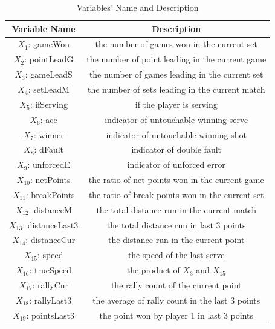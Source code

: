 \documentclass[12pt]{article}
\begin{document}
\begin{table}[h!]
\centering
\begin{tabular}{||c c||} 
 \hline
 \textbf{Variable Name} & \textbf{Description} \\ [0.5ex] 
    \hline\hline
    $X_{1}$: gameWon & the number of games won in the current set \\ 
    \hline
    $X_{2}$: pointLeadG & the number of point leading in the current game \\
    \hline
    $X_{3}$: gameLeadS & the number of games leading in the current set \\
    \hline
    $X_{4}$: setLeadM & the number of sets leading in the current match  \\
    \hline
    $X_{5}$: ifServing & if the player is serving \\ 
    \hline
    $X_{6}$: ace & indicator of untouchable winning serve \\
    \hline
    $X_{7}$: winner & indicator of untouchable winning shot \\
    \hline
    $X_{8}$: dFault & indicator of double fault \\
    \hline
    $X_{9}$: unforcedE & indicator of unforced error \\
    \hline
    $X_{10}$: netPoints & the ratio of net points won in the current game \\
    \hline
    $X_{11}$: breakPoints & the ratio of break points won in the current set \\
    \hline
    $X_{12}$: distanceM & the total distance run in the current match \\
    \hline
    $X_{13}$: distanceLast3 & the total distance run in last 3 points \\
    \hline
    $X_{14}$: distanceCur & the distance run in the current point \\ 
    \hline
    $X_{15}$: speed & the speed of the last serve \\
    \hline
    $X_{16}$: trueSpeed & the product of $X_3$ and $X_{15}$ \\
    \hline
    $X_{17}$: rallyCur & the rally count of the current point \\
    \hline
    $X_{18}$: rallyLast3 & the average of rally count in the last 3 points \\
    \hline
    $X_{19}$: pointsLast3 & the point won by player 1 in last 3 points \\
    [1ex] 
    \hline
\end{tabular}
\caption{Variables' Name and Description}
\label{table:2}
\end{table}
\end{document}
